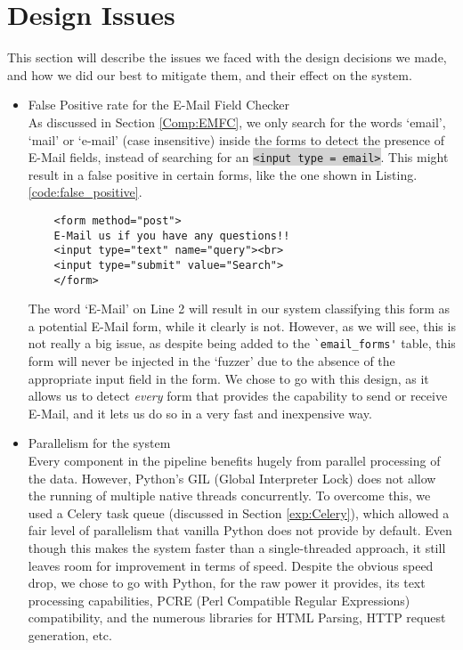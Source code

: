 \section[Issues]{Design Issues}
\label{sys:issues}
This section will describe the issues we faced with the design decisions we made, and how we did our best to mitigate them, and their effect on the system.

\begin{itemize}
	\item \label{issues:fpr}False Positive rate for the E-Mail Field Checker\\
	As discussed in Section \ref{Comp:EMFC}, we only search for the words `email', `mail' or `e-mail' (case insensitive) inside the forms to detect the presence of E-Mail fields, instead of searching for an \colorbox{lightgray}{\lstinline{<input type = email>}}. This might result in a false positive in certain forms, like the one shown in Listing. \ref{code:false_positive}.
	
	\begin{lstlisting}
	<form method="post">
	E-Mail us if you have any questions!!
	<input type="text" name="query"><br>
	<input type="submit" value="Search">
	</form>
	\end{lstlisting}
	
	The word `E-Mail' on Line 2 will result in our system classifying this form as a potential E-Mail form, while it clearly is not. However, as we will see, this is not really a big issue, as despite being added to the \lstinline{`email_forms'} table, this form will never be injected in the `fuzzer' due to the absence of the appropriate input field in the form. We chose to go with this design, as it allows us to detect \emph{every} form that provides the capability to send or receive E-Mail, and it lets us do so in a very fast and inexpensive way.
	
	
	\item Parallelism for the system\\
	\label{issues:parallel}
	Every component in the pipeline benefits hugely from parallel processing of the data. However, Python's GIL (Global Interpreter Lock) does not allow the running of multiple native threads concurrently. To overcome this, we used a Celery task queue (discussed in Section \ref{exp:Celery}), which allowed a fair level of parallelism that vanilla Python does not provide by default. Even though this makes the system faster than a single-threaded approach, it still leaves room for improvement in terms of speed. Despite the obvious speed drop, we chose to go with Python, for the raw power it provides, its text processing capabilities, PCRE (Perl Compatible Regular Expressions) compatibility, and the numerous libraries for HTML Parsing, HTTP request generation, etc.
	

\end{itemize}
